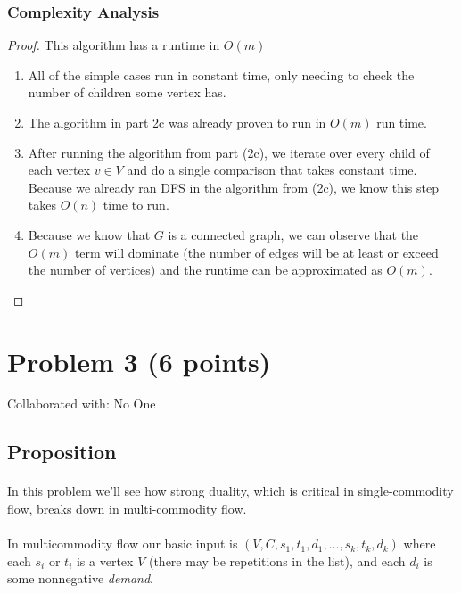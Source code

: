 \documentclass{article}
\begin{document}
\subsubsection{Complexity Analysis}
\begin{proof} This algorithm has a runtime in \(O(m)\)
      \begin{enumerate}
            \item All of the simple cases run in constant time, only needing to check the
                  number of children some vertex has.
            \item The algorithm in part 2c was already proven to run in \(O(m)\) run time.
            \item After running the algorithm from part (2c), we iterate over every child
                  of each vertex \(v \in V\) and do a single comparison that takes constant
                  time. Because we already ran DFS in the algorithm from (2c), we know this step
                  takes \(O(n)\) time to run.
            \item Because we know that \(G\) is a connected graph, we can observe that the
                  \(O(m)\) term will dominate (the number of edges will be at least or exceed
                  the number of vertices) and the runtime can be approximated as \(O(m)\).
      \end{enumerate}
\end{proof}

\newpage
\section{Problem 3 (6 points)}
Collaborated with: No One

\subsection{Proposition}
\paragraph{}
In this problem we'll see how strong duality, which is critical in single-commodity flow,
breaks down in multi-commodity flow.

\paragraph{}
In multicommodity flow our basic input is \((V, C, s_1, t_1, d_1, \ldots , s_k, t_k,
d_k)\) where each \(s_i\) or \(t_i\) is a vertex \(V\) (there may be repetitions in the
list), and each \(d_i\) is some nonnegative \textit{demand}.
\end{document}
